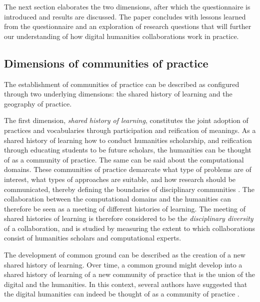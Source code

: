\documentclass{article}
\begin{document}
The next section elaborates the two dimensions, after which the questionnaire is introduced and results are discussed.
The paper concludes with lessons learned from the questionnaire and an exploration of research questions that will further our understanding of how digital humanities collaborations work in practice.

\subsection{Dimensions of communities of practice}
The %
establishment of communities of practice can be described as configured through two underlying dimensions:
the shared history of learning and the geography of practice. 

The first dimension, \textit{shared history of learning}, constitutes the joint adoption of practices and vocabularies through participation and reification of meanings. 
As a shared history of learning how to conduct humanities scholarship, and reification through educating students to be future scholars, the humanities can be thought of as a community of practice.
The same can be said about the computational domains.
These communities of practice demarcate what type of problems are of interest, what types of approaches are suitable, and how research should be communicated, thereby defining the boundaries of disciplinary communities \citep{Becher2001, Gieryn1983}.
The collaboration between the computational domains and the humanities can therefore be seen as a meeting of different histories of learning.
The meeting of shared histories of learning is therefore considered to be the \textit{disciplinary diversity} of a collaboration, and is studied by measuring the extent to which collaborations consist of humanities scholars and computational experts.

The development of common ground can be described as the creation of a new shared history of learning. 
Over time, a common ground might develop into a shared history of learning of a new community of practice that is the union of the digital and the humanities. In this context, several authors have suggested that the digital humanities can indeed be thought of as a community of practice \citep{siemens2013,siemens2016}.
\end{document}
